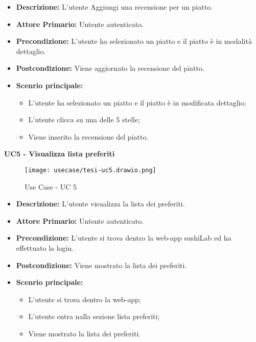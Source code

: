 \begin{itemize}
    \item \textbf{Descrizione:} L'utente Aggiungi una recensione per un piatto.
    \item \textbf{Attore Primario:} Untente autenticato.
    \item \textbf{Precondizione:} L'utente ha selezionato un piatto e il piatto è in modalità dettaglio.
    \item \textbf{Postcondizione:} Viene aggiornato la recensione del piatto.
    \item \textbf{Scenrio principale:}
    \begin{itemize}
        \item L'utente ha selezionato un piatto e il piatto è in modificata dettaglio;
        \item L'utente clicca su una delle 5 stelle;
        \item Viene inserito la recensione del piatto.
    \end{itemize}
\end{itemize}
\textbf{UC5 - Visualizza lista preferiti}
\begin{figure}[H]
    \centering
    \texttt{[image: usecase/tesi-uc5.drawio.png]}
    \caption{Use Case - UC 5}
\end{figure}
\begin{itemize}
    \item \textbf{Descrizione:} L'utente visualizza la lista dei preferiti.
    \item \textbf{Attore Primario:} Untente autenticato.
    \item \textbf{Precondizione:} L'utente si trova dentro la web-app sushiLab ed ha effettuato la login.
    \item \textbf{Postcondizione:} Viene mostrato la lista dei preferiti.
    \item \textbf{Scenrio principale:}
    \begin{itemize}
        \item L'utente si trova dentro la web-app;
        \item L'utente entra nalla sezione lista preferiti;
        \item Viene mostrato la lista dei preferiti.
    \end{itemize}
\end{itemize}
